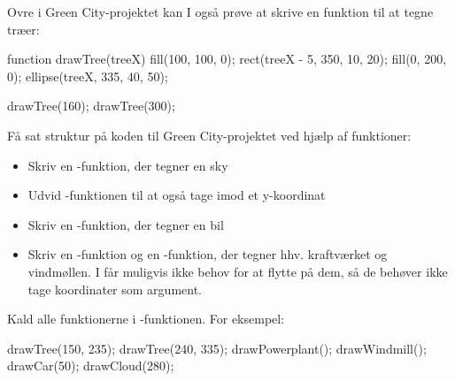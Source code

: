 \documentclass{ucph-handout}
\newcounter{handout}
\newcommand{\Ark}{Ark \#\arabic{handout} -- }
\begin{document}
\begin{exercisebox}[adjusted title=Green City fortsat]
Ovre i Green City-projektet kan I også prøve at skrive en funktion
til at tegne træer:
\begin{javascript}
function drawTree(treeX) {
    fill(100, 100, 0);
    rect(treeX - 5, 350, 10, 20);
    fill(0, 200, 0);
    ellipse(treeX, 335, 40, 50);
}

drawTree(160);
drawTree(300);
\end{javascript}

\noindent
Få sat struktur på koden til Green City-projektet ved hjælp af funktioner:
\begin{itemize}
\item Skriv en -funktion, der tegner en sky
\item Udvid -funktionen til at også tage imod et y-koordinat
\item Skriv en -funktion, der tegner en bil
\item Skriv en -funktion og en
  -funktion, der tegner hhv. kraftværket og
  vindmøllen. I får muligvis ikke behov for at flytte på dem, så de
  behøver ikke tage koordinater som argument.
\end{itemize}

\noindent
Kald alle funktionerne i -funktionen. For eksempel:

\begin{javascript}
drawTree(150, 235);
drawTree(240, 335);
drawPowerplant();
drawWindmill();
drawCar(50);
drawCloud(280);
\end{javascript}
\end{exercisebox}

\newpage

~

\newpage
{}
\renewcommand{\Title}{\Ark Animation og funktionerne \ttpy{setup}/\ttpy{draw}}
\end{document}
